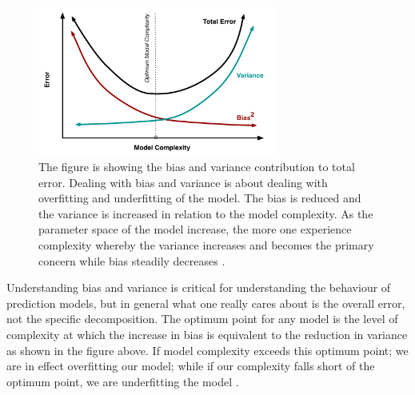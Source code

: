 \begin{figure}[H]
  \centering
    \includegraphics[width=0.7\textwidth]{images/biasvariance.png}
    \caption{The figure is showing the bias and variance contribution to total error. Dealing with bias and variance is about dealing with overfitting and underfitting of the model. The bias is reduced and the variance is increased in relation to the model complexity. As the parameter space of the model increase, the more one experience  complexity whereby the variance increases and becomes the primary concern while bias steadily decreases \citep{fortmann2012understanding}.}  
\end{figure}

Understanding bias and variance is critical for understanding the behaviour of prediction models, but in general what one really cares about is the overall error, not the specific decomposition. The optimum point for any model is the level of complexity at which the increase in bias is equivalent to the reduction in variance as shown in the figure above. If model complexity exceeds this optimum point; we are in effect overfitting our model; while if our complexity falls short of the optimum point, we are underfitting the model \citep{fortmann2012understanding}.









